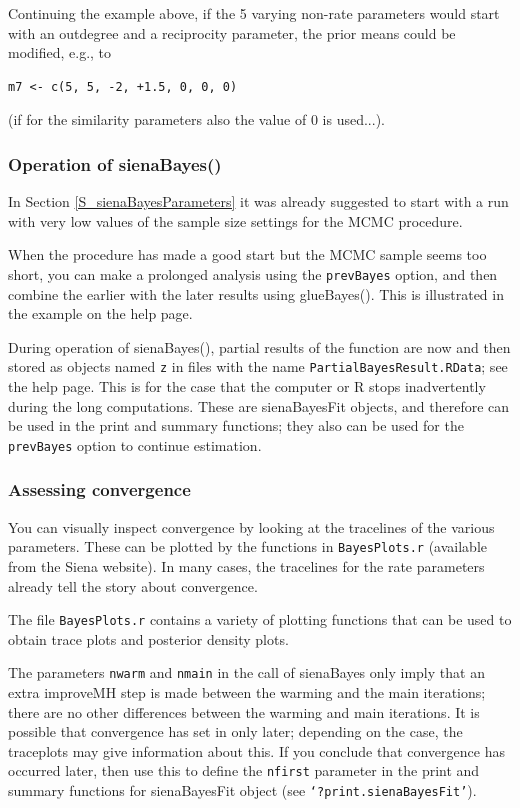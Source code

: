 \documentclass[a4paper,fleqn,11pt]{article}
\newcommand{\+}{\, + \,}
\newcommand{\sfn}[1]{\textsf{#1}}
\newcommand{\R}{{\sf R }}
\begin{document}
Continuing the example above, if the 5 varying non-rate parameters would
start with an outdegree and a reciprocity parameter, the prior means
could be modified, e.g., to
\begin{verbatim}
m7 <- c(5, 5, -2, +1.5, 0, 0, 0)
\end{verbatim}
(if for the similarity parameters also the value of 0 is used...).


\subsubsection{Operation of sienaBayes()}

In Section \ref{S_sienaBayesParameters} it was already suggested to
start with a run with very low values of the sample size settings for the
MCMC procedure.

When the procedure has made a good start but the MCMC sample seems too
short, you can make a prolonged analysis using the \texttt{prevBayes} option,
and then combine the earlier with the later results using \sfn{glueBayes()}.
This is illustrated in the example on the help page.

During operation of \sfn{sienaBayes()}, partial results of the function
are now and then stored
as objects named \texttt{z} in files with the name
\texttt{PartialBayesResult.RData}; see the help page.
This is for the case that the computer or \R stops inadvertently
during the long computations.
These are \sfn{sienaBayesFit} objects, and therefore can be used in the
\sfn{print} and \sfn{summary} functions; they also can be used for
the \texttt{prevBayes} option to continue estimation.

\subsubsection{Assessing convergence}

You can visually inspect convergence by looking at the tracelines of the
various parameters. These can be plotted by the functions in \texttt{BayesPlots.r}
(available from the Siena website). In many cases, the tracelines for
the rate parameters already tell the story about convergence.

The file \texttt{BayesPlots.r} contains a variety of plotting functions that
can be used to obtain trace plots and posterior density plots.

The parameters \texttt{nwarm} and \texttt{nmain} in the call of
\sfn{sienaBayes} only imply
that an extra \sfn{improveMH} step is made between the warming and the
main iterations; there are no other differences between the warming
and main iterations. It is possible that convergence has set in only
later; depending on the case, the traceplots may give information about this.
If you conclude that convergence has occurred later, then use this to
define the \texttt{nfirst} parameter in the \sfn{print} and
\sfn{summary} functions for
\sfn{sienaBayesFit} object (see \texttt{`?print.sienaBayesFit'}).
\end{document}
